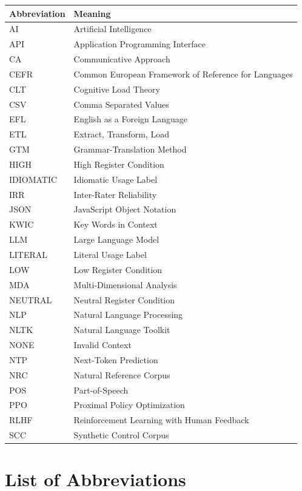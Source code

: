 \documentclass[11pt,a4paper]{article}
\begin{document}
\begin{center}
\renewcommand{\arraystretch}{1.15}
\begin{tabular}{@{}ll@{}}
\toprule
\textbf{Abbreviation} & \textbf{Meaning} \\
\midrule
AI & Artificial Intelligence \\
API & Application Programming Interface \\
CA & Communicative Approach \\
CEFR & Common European Framework of Reference for Languages \\
CLT & Cognitive Load Theory \\
CSV & Comma Separated Values \\
EFL & English as a Foreign Language \\
ETL & Extract, Transform, Load \\
GTM & Grammar-Translation Method \\
HIGH & High Register Condition \\
IDIOMATIC & Idiomatic Usage Label \\
IRR & Inter-Rater Reliability \\
JSON & JavaScript Object Notation \\
KWIC & Key Words in Context \\
LLM & Large Language Model \\
LITERAL & Literal Usage Label \\
LOW & Low Register Condition \\
MDA & Multi-Dimensional Analysis \\
NEUTRAL & Neutral Register Condition \\
NLP & Natural Language Processing \\
NLTK & Natural Language Toolkit \\
NONE & Invalid Context \\
NTP & Next-Token Prediction \\
NRC & Natural Reference Corpus \\
POS & Part-of-Speech \\
PPO & Proximal Policy Optimization \\
RLHF & Reinforcement Learning with Human Feedback \\
SCC & Synthetic Control Corpus \\
\bottomrule
\end{tabular}
\end{center}

\newpage
\section*{List of Abbreviations}
\end{document}
